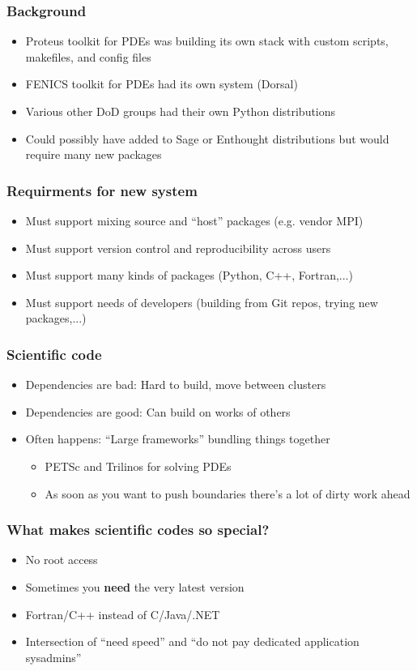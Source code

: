 \documentclass[sans,mathserif]{beamer}
\begin{document}
\begin{frame}
\frametitle{Background}
\begin{itemize}
\item Proteus toolkit for PDEs was building its own stack with custom scripts, makefiles, and config files
\item FENICS toolkit  for PDEs had its own system (Dorsal)
\item Various other DoD groups had their own Python distributions
\item Could possibly have added to Sage or Enthought distributions but would require many new packages
\end{itemize}
\end{frame}

\begin{frame}
\frametitle{Requirments for new system}
\begin{itemize}
\item Must support mixing source and ``host'' packages (e.g. vendor MPI)
\item Must support version control and reproducibility across users
\item Must support many kinds of packages (Python, C++, Fortran,...)
\item Must support needs of developers (building from Git repos, trying new packages,...)
\end{itemize}
\end{frame}

\begin{frame}
  \frametitle{Scientific code}
  \begin{itemize}
  \item<+-> Dependencies are bad: Hard to build, move between clusters
  \item<+-> Dependencies are good: Can build on works of others
  \item<+-> Often happens: ``Large frameworks'' bundling things together
    \begin{itemize}
    \item<+-> PETSc and Trilinos for solving PDEs
    \item<+-> As soon as you want to push boundaries there's a lot of dirty work ahead
    \end{itemize}
  \end{itemize}
\end{frame}

\begin{frame}[fragile]
  \frametitle{What makes scientific codes so special?}

  \begin{itemize}
    \item<+-> No root access
    \item<+-> Sometimes you {\bf need} the very latest version
    \item<+-> Fortran/C++ instead of C/Java/.NET
    \item<+-> Intersection of ``need speed'' and ``do not pay dedicated application sysadmins''
  \end{itemize}
\end{frame}
\end{document}
